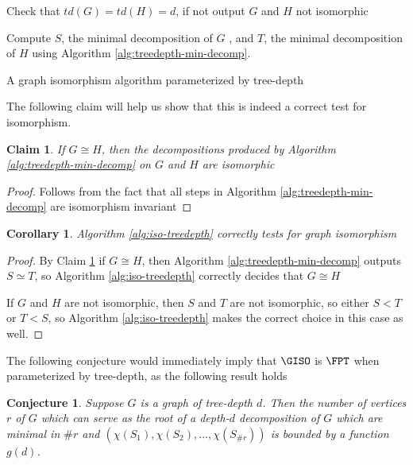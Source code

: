 \documentclass[11pt]{report}
\newtheorem{claim}{Claim}
\newtheorem{cor}{Corollary}
\newtheorem{conj}{Conjecture}
\begin{document}
\begin{algorithm}[h]
\SetAlgoNoLine
{}

Check that $td(G)=td(H)=d$, if not output $G$ and $H$ not isomorphic

Compute $S$, the minimal decomposition of $G$ , and $T$, the minimal decomposition of $H$ using Algorithm \ref{alg:treedepth-min-decomp}.




\caption{A graph isomorphism algorithm parameterized by tree-depth}
\label{alg:iso-treedepth}
\end{algorithm}


\newpage
The following claim will help us show that this is indeed a correct test for isomorphism.

\begin{claim} If $G\cong H$, then the decompositions produced by Algorithm \ref{alg:treedepth-min-decomp} on $G$ and $H$ are isomorphic
\label{clm_td_alg_iso_invariant}
\end{claim}
\begin{proof} Follows from the fact that all steps in Algorithm \ref{alg:treedepth-min-decomp} are isomorphism invariant
\end{proof}
\begin{cor}
Algorithm \ref{alg:iso-treedepth} correctly tests for graph isomorphism
\label{cor_td_alg_correct}
\end{cor}
\begin{proof}
By Claim \ref{clm_td_alg_iso_invariant} if $G\cong H$, then Algorithm \ref{alg:treedepth-min-decomp} outputs $S\simeq T$, so Algorithm \ref{alg:iso-treedepth} correctly decides that $G\cong H$

If $G$ and $H$ are not isomorphic, then $S$ and $T$ are not isomorphic, so either $S<T$ or $T<S$, so Algorithm \ref{alg:iso-treedepth} makes the correct choice in this case as well.


\end{proof}


The following conjecture would immediately imply that $\GISO$ is $\FPT$ when parameterized by tree-depth, as the following result holds

\begin{conj}
Suppose $G$ is a graph of tree-depth $d$. Then the number of vertices $r$ of $G$ which can serve as the root of a depth-$d$ decomposition of $G$ which are minimal in $\# r$ and $(\chi(S_1), \chi(S_2), ...,\chi (S_{\# r}))$ is bounded by a function $g(d)$.
\label{lem:td_bounded_roots}
\end{conj}
\end{document}
